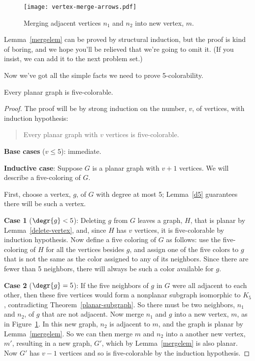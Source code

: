 \begin{figure}%
\centering \texttt{[image: vertex-merge-arrows.pdf]}
\caption{Merging adjacent vertices $n_1$ and $n_2$ into new vertex, $m$.}
\label{fig:merged}
\end{figure}

Lemma~\ref{mergelem} can be proved by structural induction, but the proof
is kind of boring, and we hope you'll be relieved that we're going to omit
it.  (If you insist, we can add it to the next problem set.)

Now we've got all the simple facts we need to prove 5-colorability.
\begin{theorem}
Every planar graph is five-colorable.
\end{theorem}

\begin{proof}
The proof will be by strong induction on the number, $v$, of vertices, with
induction hypothesis:
\begin{quote}
Every planar graph with $v$ vertices is five-colorable.
\end{quote}

\textbf{Base cases} ($v \leq 5$): immediate.

\textbf{Inductive case}: Suppose $G$ is a planar graph with $v+1$
vertices.  We will describe a five-coloring of $G$.

First, choose a vertex, $g$, of $G$ with degree at most 5; Lemma~\ref{d5}
guarantees there will be such a vertex.

\textbf{Case 1} ($\degr{g}<5$): Deleting $g$ from $G$ leaves a graph, $H$,
that is planar by Lemma~\ref{delete-vertex}, and, since $H$ has $v$ vertices,
it is five-colorable by induction hypothesis.  Now define a five coloring
of $G$ as follows: use the five-coloring of $H$ for all the vertices besides
$g$, and assign one of the five colors to $g$ that is not the same as the
color assigned to any of its neighbors.  Since there are fewer than 5
neighbors, there will always be such a color available for $g$.

\textbf{Case 2} ($\degr{g}=5$): If the five neighbors of $g$ in $G$ were
all adjacent to each other, then these five vertices would form a
nonplanar subgraph isomorphic to $K_5$, contradicting
Theorem~\ref{planar-subgraph}.  So there must be two neighbors, $n_1$ and
$n_2$, of $g$ that are not adjacent.  Now merge $n_1$ and $g$ into a new
vertex, $m$, as in Figure~\ref{fig:merged}.  In this new graph, $n_2$ is
adjacent to $m$, and the graph is planar by Lemma~\ref{mergelem}.  So we
can then merge $m$ and $n_2$ into a another new vertex, $m'$, resulting in
a new graph, $G'$, which by Lemma~\ref{mergelem} is also planar.  Now $G'$
has $v-1$ vertices and so is five-colorable by the induction hypothesis.


\end{proof}
